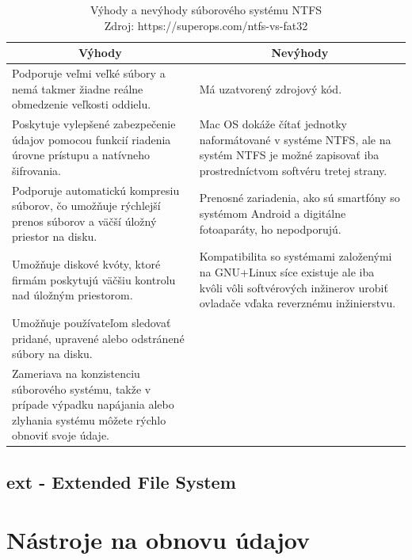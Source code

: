 \documentclass[12pt,oneside,slovak,a4paper]{article}
\begin{document}
\begin{table}[H]
\begin{tabularx}{\linewidth}{|X|X|}
\hline
\multicolumn{1}{|c|}{\textbf{Výhody}} & \multicolumn{1}{c|}{\textbf{Nevýhody}} \\ \hline
Podporuje veľmi veľké súbory a nemá takmer žiadne reálne obmedzenie veľkosti oddielu. & Má uzatvorený zdrojový kód. \\ \hline
Poskytuje vylepšené zabezpečenie údajov pomocou funkcií riadenia úrovne prístupu a natívneho šifrovania. & Mac OS dokáže čítať jednotky naformátované v systéme NTFS, ale na systém NTFS je možné zapisovať iba prostredníctvom softvéru tretej strany. \\ \hline
Podporuje automatickú kompresiu súborov, čo umožňuje rýchlejší prenos súborov a väčší úložný priestor na disku. & Prenosné zariadenia, ako sú smartfóny so systémom Android a digitálne fotoaparáty, ho nepodporujú. \\ \hline
Umožňuje diskové kvóty, ktoré firmám poskytujú väčšiu kontrolu nad úložným priestorom. & Kompatibilita so systémami založenými na GNU+Linux síce existuje ale iba kvôli vôli softvérových inžinerov urobiť ovladače vďaka reverznému inžinierstvu. \\ \hline
Umožňuje používateľom sledovať pridané, upravené alebo odstránené súbory na disku. &  \\ \hline
Zameriava na konzistenciu súborového systému, takže v prípade výpadku napájania alebo zlyhania systému môžete rýchlo obnoviť svoje údaje. &  \\ \hline
\end{tabularx}
\centering
\captionsetup{justification=centering,margin=2cm}
\caption{Výhody a nevýhody súborového systému NTFS \\ Zdroj: https://superops.com/ntfs-vs-fat32}
\end{table}

\subsection{ext - Extended File System}



\section{Nástroje na obnovu údajov}
\end{document}
